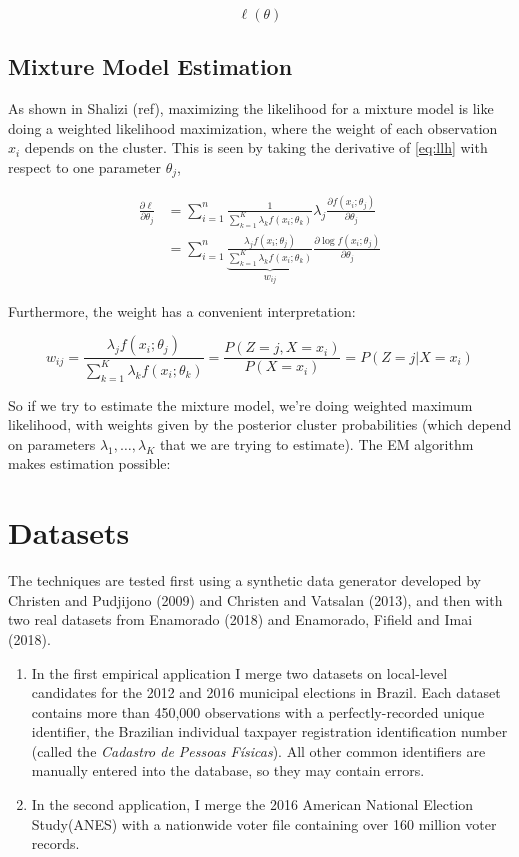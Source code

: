 \documentclass[11pt,reqno]{amsart}
\begin{document}

\begin{equation} \ell(\theta) \end{equation}
\subsection{Mixture Model Estimation}
As shown in Shalizi (ref), maximizing the likelihood for a mixture model is like doing a weighted likelihood maximization, where the weight of each observation $x_i$ depends on the cluster.  This is seen by taking the derivative of \eqref{eq:llh} with respect to one parameter $\theta_j$,

\begin{align*}
\frac{\partial \ell}{\partial \theta_j} &= \sum_{i=1}^n \frac{1}{\sum_{k=1}^K\lambda_k f(x_i; \theta_k)} \lambda_j \frac{\partial f(x_i;\theta_j)}{\partial \theta_j} \\
&= \sum_{i=1}^n \underbrace{\frac{\lambda_j f(x_i;\theta_j)}{\sum_{k=1}^K\lambda_k f(x_i; \theta_k)}}_{w_{ij}}  \frac{\partial \log f(x_i;\theta_j)}{\partial \theta_j} 
\end{align*}

Furthermore, the weight has a convenient interpretation:

\[w_{ij} = \frac{\lambda_j f(x_i;\theta_j)}{\sum_{k=1}^K\lambda_k f(x_i; \theta_k)} = \frac{P(Z=j, X=x_i)}{P(X=x_i)}= P(Z=j | X=x_i)\] 

So if we try to estimate the mixture model, we're doing weighted maximum likelihood, with weights given by the posterior cluster probabilities (which depend on parameters $\lambda_1,\dots,\lambda_K$ that we are trying to estimate).  The EM algorithm makes estimation possible: 

\section{Datasets}
The techniques are tested first using a synthetic data generator developed by Christen and Pudjijono (2009) and Christen and Vatsalan (2013), and then with two real datasets from Enamorado (2018) and Enamorado, Fifield and Imai (2018). 
\begin{enumerate}
\item In the first empirical application I merge two datasets on local-level candidates for the 2012 and 2016 municipal elections in Brazil.  Each dataset contains more than 450,000 observations with a perfectly-recorded unique identifier, the Brazilian individual taxpayer registration identification number (called the \textit{Cadastro de Pessoas F\'isicas}).  All other common identifiers are manually entered into the database, so they may contain errors.  

\item In the second application, I merge the 2016 American National Election Study(ANES) with a nationwide voter file containing over 160 million voter records.  
\end{enumerate}
\end{document}

